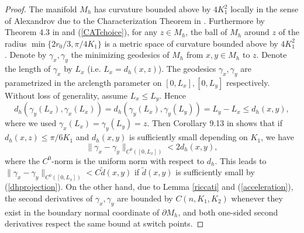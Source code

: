 \documentclass[11pt,letterpaper]{amsart}
\numberwithin{equation}{section}
\theoremstyle{definition}
\theoremstyle{plain}
\theoremstyle{definition}
\theoremstyle{plain}
\theoremstyle{definition}
\theoremstyle{plain}
\begin{document}
\begin{proof}
The manifold $M_{h}$ has curvature bounded above by $4K_1^2$ locally in the sense of Alexandrov due to the Characterization Theorem in \cite{ABB2}. Furthermore by Theorem 4.3 in \cite{AB} and (\ref{CATchoice}), for any $z\in M_h$, the ball of $M_h$ around $z$ of the radius $\min\{2r_0/3,\pi/4K_1\}$ is a metric space of curvature bounded above by $4K_1^2$ . Denote by $\gamma_{x},\gamma_{y}$ the minimizing geodesics of $M_h$ from $x,y\in M_h$ to $z$. Denote the length of $\gamma_x$ by $L_x$ (i.e. $L_x=d_h(x,z)$). The geodesics $\gamma_x,\gamma_y$ are parametrized in the arclength parameter on $[0,L_x],[0,L_y]$ respectively. Without loss of generality, assume $L_x\leqslant L_y$. Hence
$$d_h(\gamma_y(L_x),\gamma_x(L_x))=d_h(\gamma_y(L_x),\gamma_y(L_y))=L_y-L_x\leqslant d_h(x,y),$$
where we used $\gamma_x(L_x)=\gamma_y(L_y)=z$. Then Corollary 9.13 in \cite{AKP} shows that if $d_h(x,z)\leqslant \pi/6K_1$ and $d_h(x,y)$ is sufficiently small depending on $K_1$, we have 
$$\|\gamma_{x}-\gamma_{y}\|_{C^0([0,L_x])} < 2d_h(x,y),$$ 
where the $C^0$-norm is the uniform norm with respect to $d_h$. This leads to $\|\gamma_{x}-\gamma_{y}\|_{C^0([0,L_x])} < C\widetilde{d}(x,y)$ if $\widetilde{d}(x,y)$ is sufficiently small by (\ref{dhprojection}). On the other hand, due to Lemma \ref{riccati} and (\ref{acceleration}), the second derivatives of $\gamma_{x},\gamma_{y}$ are bounded by $C(n,K_1,K_2)$ whenever they exist in the boundary normal coordinate of $\partial M_h$, and both one-sided second derivatives respect the same bound at switch points.


\end{proof}
\end{document}
